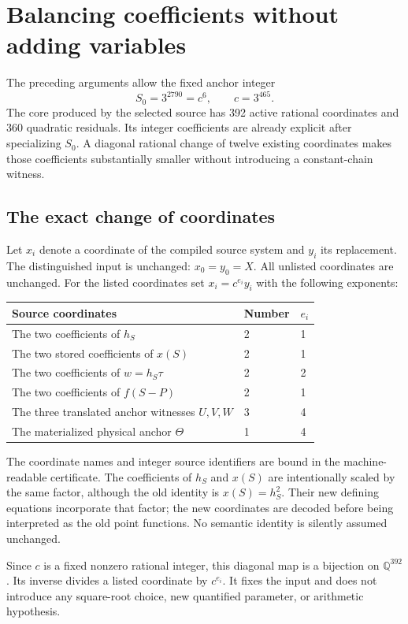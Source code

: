 \section{Balancing coefficients without adding variables}

The preceding arguments allow the fixed anchor integer
\[
 S_0=3^{2790}=c^6,\qquad c=3^{465}.
\]
The core produced by the selected source has 392 active rational
coordinates and 360 quadratic residuals. Its integer coefficients are
already explicit after specializing $S_0$. A diagonal rational change
of twelve existing coordinates makes those coefficients substantially
smaller without introducing a constant-chain witness.

\subsection{The exact change of coordinates}

Let $x_i$ denote a coordinate of the compiled source system and $y_i$
its replacement. The distinguished input is unchanged: $x_0=y_0=X$.
All unlisted coordinates are unchanged. For the listed coordinates set
$x_i=c^{e_i}y_i$ with the following exponents:
\begin{center}
\begin{tabular}{lll}
\toprule
Source coordinates & Number & $e_i$\\\midrule
The two coefficients of $h_S$ &2&1\\
The two stored coefficients of $x(S)$ &2&1\\
The two coefficients of $w=h_S\tau$ &2&2\\
The two coefficients of $f(S-P)$ &2&1\\
The three translated anchor witnesses $U,V,W$ &3&4\\
The materialized physical anchor $\Theta$ &1&4\\\bottomrule
\end{tabular}
\end{center}

The coordinate names and integer source identifiers are bound in the
machine-readable certificate. The coefficients of $h_S$ and $x(S)$
are intentionally scaled by the same factor, although the old identity
is $x(S)=h_S^2$. Their new defining equations incorporate that factor;
the new coordinates are decoded before being interpreted as the old
point functions. No semantic identity is silently assumed unchanged.

Since $c$ is a fixed nonzero rational integer, this diagonal map is a
bijection on $\mathbb Q^{392}$. Its inverse divides a listed coordinate
by $c^{e_i}$. It fixes the input and does not introduce any square-root
choice, new quantified parameter, or arithmetic hypothesis.

